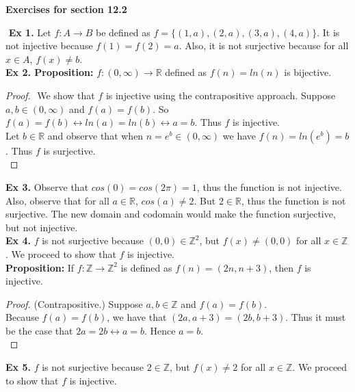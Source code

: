 \documentclass{article}
\date{}
\author{}
\begin{document}
\centerline{\textbf{Exercises for section 12.2}}
$ $\newline
\noindent\textbf{Ex 1.} Let $f:A \rightarrow B$ be defined as $f=\{(1,a), (2,a), (3, a), (4, a)\}$. It is not injective because $f(1)=f(2)=a$. Also, it is not surjective because for all $x \in A$, $f(x) \neq b$.\\

\noindent\textbf{Ex 2. Proposition:} $f: (0, \infty) \rightarrow \mathbb{R}$ defined as $f(n)=ln(n)$ is bijective.
\begin{proof}
$ $\newline 
We show that $f$ is injective using the contrapositive approach. Suppose $a, b \in (0, \infty)$ and $f(a)=f(b)$. So $f(a)=f(b) \leftrightarrow ln(a)=ln(b) \leftrightarrow a=b$. Thus $f$ is injective.\\

\noindent Let $b \in \mathbb{R}$ and observe that when $n=e^b \in (0, \infty)$ we have $f(n)= ln(e^b)=b$. Thus $f$ is surjective.\\
\end{proof}

\noindent\textbf{Ex 3.} Observe that $cos(0)=cos(2\pi)=1$, thus the function is not injective. Also, observe that for all $a \in \mathbb{R}$, $cos(a) \neq 2$. But $2 \in \mathbb{R}$, thus the function is not surjective. The new domain and codomain would make the function surjective, but not injective.\\

\noindent\textbf{Ex 4.} $f$ is not surjective because $(0,0) \in \mathbb{Z}^2$, but $f(x) \neq (0,0)$ for all $x \in \mathbb{Z}$. We proceed to show that $f$ is injective.\\

\noindent\textbf{Proposition:} If $f: \mathbb{Z} \rightarrow \mathbb{Z}^2$ is defined as $f(n)=(2n, n+3)$, then $f$ is injective.
\begin{proof}
(Contrapositive.) Suppose $a, b \in \mathbb{Z}$ and $f(a)=f(b)$.\\
Because $f(a)=f(b)$, we have that $(2a, a+3) = (2b, b+3)$. Thus it must be the case that $2a=2b \leftrightarrow a = b$. Hence $a=b$.\\
\end{proof}

\noindent\textbf{Ex 5.} $f$ is not surjective because $2 \in \mathbb{Z}$, but $f(x) \neq 2$ for all $x \in \mathbb{Z}$. We proceed to show that $f$ is injective.\\
\end{document}
